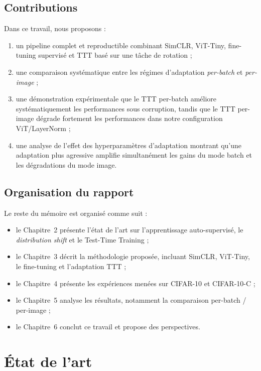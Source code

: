 \documentclass[12pt,a4paper]{report}
\begin{document}
	\section{Contributions}
	Dans ce travail, nous proposons :
	
	\begin{enumerate}
		\item un pipeline complet et reproductible combinant SimCLR, ViT-Tiny, fine-tuning supervisé et TTT basé sur une tâche de rotation ;
		\item une comparaison systématique entre les régimes d’adaptation \emph{per-batch} et \emph{per-image} ;
		\item une démonstration expérimentale que le TTT per-batch améliore systématiquement les performances sous corruption, tandis que le TTT per-image dégrade fortement les performances dans notre configuration ViT/LayerNorm ;
		\item une analyse de l’effet des hyperparamètres d’adaptation montrant qu’une adaptation plus agressive amplifie simultanément les gains du mode batch et les dégradations du mode image.
	\end{enumerate}
	
	\section{Organisation du rapport}
		Le reste du mémoire est organisé comme suit :
	
	\begin{itemize}
		\item le Chapitre~2 présente l’état de l’art sur l’apprentissage auto-supervisé, le \emph{distribution shift} et le Test-Time Training ;
		\item le Chapitre~3 décrit la méthodologie proposée, incluant SimCLR, ViT-Tiny, le fine-tuning et l’adaptation TTT ;
		\item le Chapitre~4 présente les expériences menées sur CIFAR-10 et CIFAR-10-C ;
		\item le Chapitre~5 analyse les résultats, notamment la comparaison per-batch / per-image ;
		\item le Chapitre~6 conclut ce travail et propose des perspectives.
	\end{itemize}
	
	\chapter{État de l’art}
	
\end{document}
